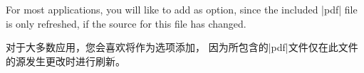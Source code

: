 
\begin{marker}
For most applications, you will like to add  as option,
since the included |pdf| file is only refreshed, if the source for this file
has changed.

对于大多数应用，您会喜欢将作为选项添加， 因为所包含的|pdf|文件仅在此文件的源发生更改时进行刷新。
\end{marker}
